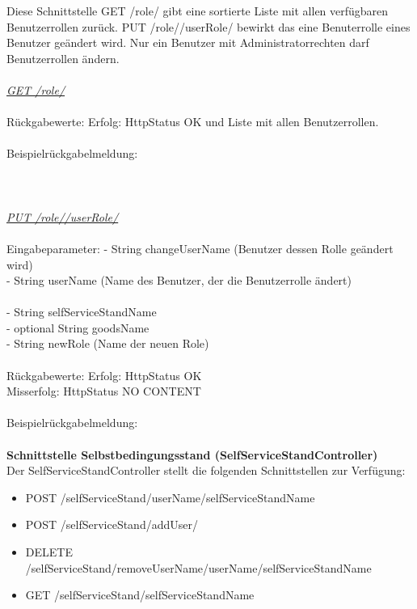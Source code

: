 Diese Schnittstelle GET /role/ gibt eine sortierte Liste mit allen verfügbaren Benutzerrollen zurück.
PUT /role//userRole/ bewirkt das eine Benuterrolle eines Benutzer geändert wird. Nur ein Benutzer mit Administratorrechten darf Benutzerrollen ändern.
\\
\\
\textit{\underline{GET /role/}}
\\
\\
Rückgabewerte: \tab 					Erfolg: HttpStatus OK und Liste mit allen Benutzerrollen.\\
\\
Beispielrückgabelmeldung:	
\\
\\
\\
\\
\textit{\underline{PUT /role//userRole/}}
\\
\\
Eingabeparameter: \tab			- String changeUserName (Benutzer dessen Rolle geändert wird)\\
\tab \tab                        		- String userName (Name des Benutzer, der die Benutzerrolle ändert)\\\\
\tab \tab                        		- String selfServiceStandName\\
\tab \tab                         		- optional String goodsName \\
\tab \tab                         		- String newRole (Name der neuen Role) \\                  
\\
Rückgabewerte: \tab 					Erfolg: HttpStatus OK \\
\tab \tab 								Misserfolg: HttpStatus NO CONTENT \\
\\
Beispielrückgabelmeldung:	
\\
\\
\textbf{Schnittstelle Selbstbedingungsstand (SelfServiceStandController)}
\\
Der SelfServiceStandController stellt die folgenden Schnittstellen zur Verfügung:

\begin{itemize}
	\itemsep0pt
	\item  POST /selfServiceStand/{userName}/{selfServiceStandName}
	\item  POST /selfServiceStand/addUser/
	\item  DELETE /selfServiceStand/{removeUserName}/{userName}/{selfServiceStandName}
	\item GET /selfServiceStand/{selfServiceStandName}
\end{itemize}


